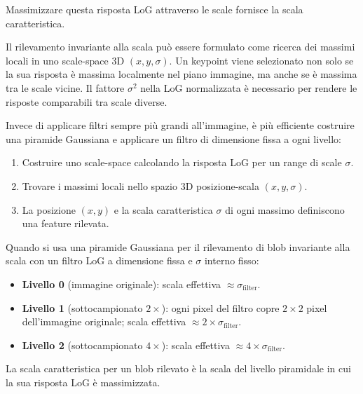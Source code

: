 \documentclass[12pt, a4paper]{report}
\begin{document}
Massimizzare questa risposta LoG attraverso le scale fornisce la scala caratteristica.

\begin{defbox}
Il rilevamento invariante alla scala può essere formulato come ricerca dei massimi
locali in uno scale-space 3D $(x, y, \sigma)$.  Un keypoint viene selezionato non
solo se la sua risposta è massima localmente nel piano immagine, ma anche se è
massima tra le scale vicine.  Il fattore $\sigma^2$ nella LoG normalizzata è
necessario per rendere le risposte comparabili tra scale diverse.
\end{defbox}

\begin{notebox}
Invece di applicare filtri sempre più grandi all'immagine, è più efficiente
costruire una piramide Gaussiana e applicare un filtro di dimensione fissa a ogni
livello:
\begin{enumerate}
  \item Costruire uno scale-space calcolando la risposta LoG per un range di scale
        $\sigma$.
  \item Trovare i massimi locali nello spazio 3D posizione-scala $(x,y,\sigma)$.
  \item La posizione $(x,y)$ e la scala caratteristica $\sigma$ di ogni massimo
        definiscono una feature rilevata.
\end{enumerate}
\end{notebox}

\begin{notebox}
Quando si usa una piramide Gaussiana per il rilevamento di blob invariante alla
scala con un filtro LoG a dimensione fissa e $\sigma$ interno fisso:
\begin{itemize}
  \item \textbf{Livello 0} (immagine originale): scala effettiva
        $\approx \sigma_{\text{filter}}$.
  \item \textbf{Livello 1} (sottocampionato $2\times$): ogni pixel del filtro copre
        $2\times2$ pixel dell'immagine originale; scala effettiva
        $\approx 2\times\sigma_{\text{filter}}$.
  \item \textbf{Livello 2} (sottocampionato $4\times$): scala effettiva
        $\approx 4\times\sigma_{\text{filter}}$.
\end{itemize}
La scala caratteristica per un blob rilevato è la scala del livello piramidale in
cui la sua risposta LoG è massimizzata.
\end{notebox}
\end{document}
